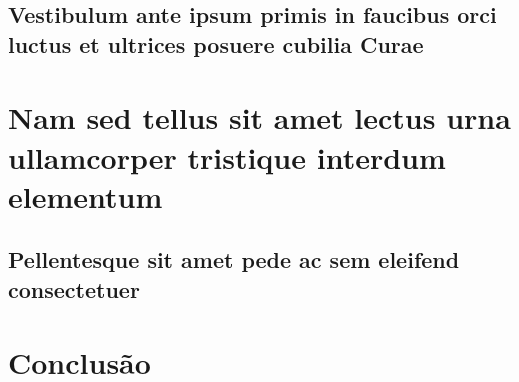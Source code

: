 \documentclass[
	12pt,				%
	openright,			%
	twoside,			%
	a4paper,			%
	english,			%
	french,				%
	spanish,			%
	brazil				%
	]{abntex2}
\begin{document}
\section{Vestibulum ante ipsum primis in faucibus orci luctus et ultrices
posuere cubilia Curae}

\lipsum[21-22]

\chapter{Nam sed tellus sit amet lectus urna ullamcorper tristique interdum
elementum}

\section{Pellentesque sit amet pede ac sem eleifend consectetuer}

\lipsum[24]


\chapter{Conclusão}

\lipsum[31-33]

\postextual



%
%

\end{document}
